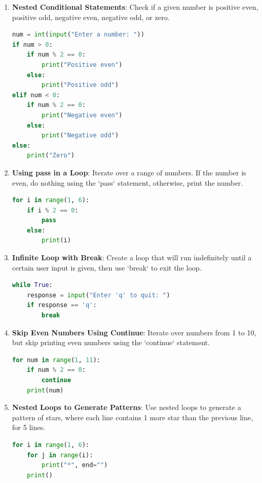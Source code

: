 \documentclass[12pt]{book}
\begin{document}
\begin{enumerate}
	\item \textbf{Nested Conditional Statements}: Check if a given number is positive even, positive odd, negative even, negative odd, or zero. \\

\begin{lstlisting}[language=Python]
num = int(input("Enter a number: "))
if num > 0:
    if num % 2 == 0:
        print("Positive even")
    else:
        print("Positive odd")
elif num < 0:
    if num % 2 == 0:
        print("Negative even")
    else:
        print("Negative odd")
else:
    print("Zero")
\end{lstlisting}

	\item \textbf{Using pass in a Loop}: Iterate over a range of numbers. If the number is even, do nothing using the `pass` statement, otherwise, print the number. \\

\begin{lstlisting}[language=Python]
for i in range(1, 6):
    if i % 2 == 0:
        pass
    else:
        print(i)
\end{lstlisting}

	\item \textbf{Infinite Loop with Break}: Create a loop that will run indefinitely until a certain user input is given, then use `break` to exit the loop. \\

\begin{lstlisting}[language=Python]
while True:
    response = input("Enter 'q' to quit: ")
    if response == 'q':
        break
\end{lstlisting}

	\item \textbf{Skip Even Numbers Using Continue}: Iterate over numbers from 1 to 10, but skip printing even numbers using the `continue` statement. \\

\begin{lstlisting}[language=Python]
for num in range(1, 11):
    if num % 2 == 0:
        continue
    print(num)
\end{lstlisting}

	\item \textbf{Nested Loops to Generate Patterns}: Use nested loops to generate a pattern of stars, where each line contains 1 more star than the previous line, for 5 lines. \\

\begin{lstlisting}[language=Python]
for i in range(1, 6):
    for j in range(i):
        print("*", end="")
    print()
\end{lstlisting}

\end{enumerate}
\end{document}
